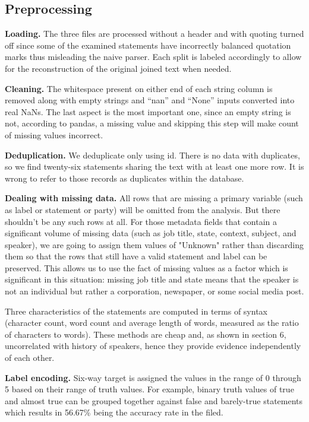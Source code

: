 \documentclass[10pt,twocolumn,twoside,a4paper]{article}
\begin{document}
\subsection{Preprocessing}

\textbf{Loading.} The three files are processed without a header and with quoting turned off since some of the examined statements have incorrectly balanced quotation marks thus misleading the naive parser. Each split is labeled accordingly to allow for the reconstruction of the original joined text when needed.

\textbf{Cleaning.} The whitespace present on either end of each string column is removed along with empty strings and ``nan'' and ``None'' inputs converted into real NaNs. The last aspect is the most important one, since an empty string is not, according to pandas, a missing value and skipping this step will make count of missing values incorrect.

\textbf{Deduplication.} We deduplicate only using id. There is no data with duplicates, so we find twenty-six statements sharing the text with at least one more row. It is wrong to refer to those records as duplicates within the database.

\textbf{Dealing with missing data.} All rows that are missing a primary variable (such as label or statement or party) will be omitted from the analysis. But there shouldn't be any such rows at all. For those metadata fields that contain a significant volume of missing data (such as job title, state, context, subject, and speaker), we are going to assign them values of "Unknown" rather than discarding them so that the rows that still have a valid statement and label can be preserved. This allows us to use the fact of missing values as a factor which is significant in this situation: missing job title and state means that the speaker is not an individual but rather a corporation, newspaper, or some social media post.

Three characteristics of the statements are computed in terms of syntax (character count, word count and average length of words, measured as the ratio of characters to words). These methods are cheap and, as shown in section 6, uncorrelated with history of speakers, hence they provide evidence independently of each other.

\textbf{Label encoding.} Six-way target is assigned the values in the range of 0 through 5 based on their range of truth values. For example, binary truth values of true and almost true can be grouped together against false and barely-true statements which results in 56.67\% being the accuracy rate in the filed.
\end{document}
